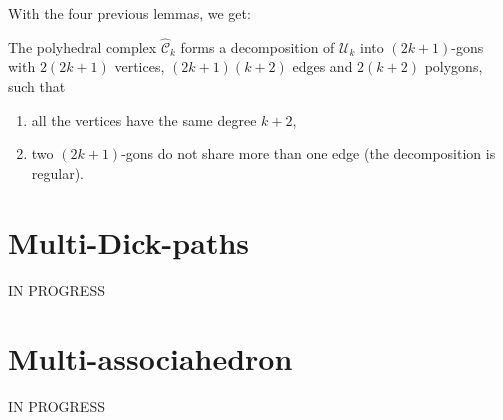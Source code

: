 \documentclass[12pt]{amsart}
\begin{document}
With the four previous lemmas, we get:

\begin{corollary}
The polyhedral complex $\hat{\mathcal{C}}_k$ forms a decomposition of $\mathcal{U}_k$ into $(2k+1)$-gons with $2(2k+1)$ vertices, $(2k+1)(k+2)$ edges and $2(k+2)$ polygons, such that
\begin{enumerate}
\item all the vertices have the same degree $k+2$,
\item two $(2k+1)$-gons do not share more than one edge (the decomposition is regular).
\end{enumerate}
\end{corollary}




\section{Multi-Dick-paths}

IN PROGRESS


\section{Multi-associahedron}

IN PROGRESS



\end{document}
